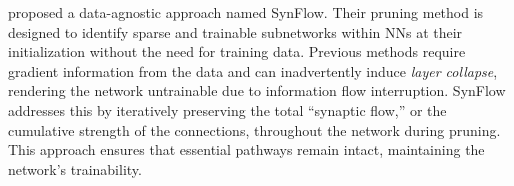 \citet{tanaka2020pruning} proposed a data-agnostic approach named SynFlow. Their pruning method is designed to identify sparse and trainable subnetworks within NNs at their initialization without the need for training data. Previous methods require gradient information from the data and can inadvertently induce \textit{layer collapse}, rendering the network untrainable due to information flow interruption. SynFlow addresses this by iteratively preserving the total ``synaptic flow,'' or the cumulative strength of the connections, throughout the network during pruning. This approach ensures that essential pathways remain intact, maintaining the network's trainability. 



